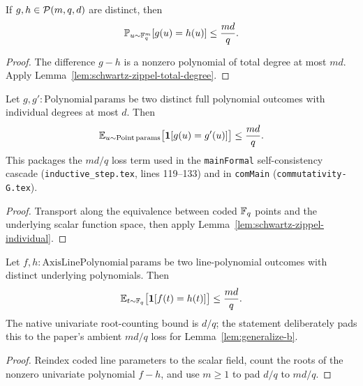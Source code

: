 \begin{lemma}\label{lem:schwartz-zippel-individual}
	\leanok
	If $g,h \in \mathcal{P}(m,q,d)$ are distinct, then
	\[
		\mathbb{P}_{u \sim \mathbb{F}_q^m}[g(u)=h(u)] \le \frac{md}{q}.
	\]
\end{lemma}
\begin{proof}
	\leanok
	The difference $g-h$ is a nonzero polynomial of total degree at most $md$. Apply Lemma~\ref{lem:schwartz-zippel-total-degree}.
\end{proof}

\begin{lemma}\label{lem:polynomial-agreement-mdq}
	\leanok
	Let $g, g' : \mathrm{Polynomial}\,\mathrm{params}$ be two distinct full polynomial outcomes with individual degrees at most $d$. Then
	\[
		\mathbb{E}_{u \sim \mathrm{Point}\,\mathrm{params}}\bigl[\mathbf{1}[g(u) = g'(u)]\bigr] \le \frac{md}{q}.
	\]
	This packages the $md/q$ loss term used in the \texttt{mainFormal} self-consistency cascade (\texttt{inductive\_step.tex}, lines 119--133) and in \texttt{comMain} (\texttt{commutativity-G.tex}).
\end{lemma}
\begin{proof}
	\leanok
	Transport along the equivalence between coded $\mathbb{F}_q$ points and the underlying scalar function space, then apply Lemma~\ref{lem:schwartz-zippel-individual}.
\end{proof}

\begin{lemma}\label{lem:axis-line-polynomial-agreement-mdq}
	\leanok
	Let $f,h : \mathrm{AxisLinePolynomial}\,\mathrm{params}$ be two line-polynomial outcomes with distinct underlying polynomials. Then
	\[
		\mathbb{E}_{t \sim \mathbb{F}_q}\bigl[\mathbf{1}[f(t)=h(t)]\bigr] \le \frac{md}{q}.
	\]
	The native univariate root-counting bound is $d/q$; the statement deliberately pads this to the paper's ambient $md/q$ loss for Lemma~\ref{lem:generalize-b}.
\end{lemma}
\begin{proof}
	\leanok
	Reindex coded line parameters to the scalar field, count the roots of the nonzero univariate polynomial $f-h$, and use $m\ge 1$ to pad $d/q$ to $md/q$.
\end{proof}


